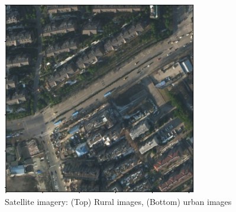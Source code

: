 \documentclass{article}
\begin{document}
\begin{multicols}{2}
\begin{figure}[H]
\begin{minipage}{0.48\linewidth}
			\end{minipage}
			\begin{minipage}{0.48\linewidth}
				\centering
				\includegraphics[width=1\linewidth]{image/urban_3.png}

			\end{minipage}

			\caption{Satellite imagery: (Top) Rural images, (Bottom) urban images }
			\label{fig:dataset_urban_image1}

		\end{figure}

	\end{multicols}
\end{document}
